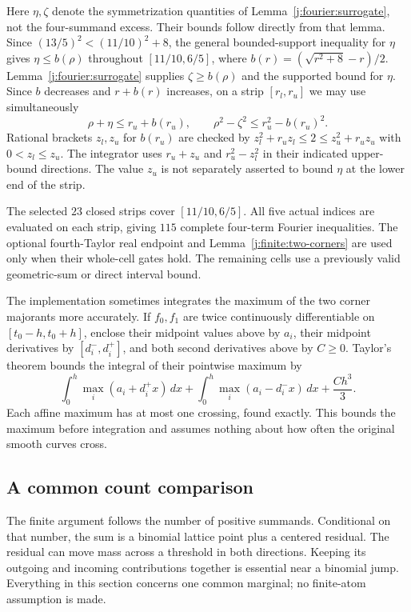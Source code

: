 Here $\eta,\zeta$ denote the symmetrization quantities of
Lemma~\ref{j:fourier:surrogate}, not the four-summand excess. Their
bounds follow directly from that lemma. Since
$(13/5)^2< (11/10)^2+8$, the general bounded-support inequality
for $\eta$ gives $\eta\le b(\rho)$ throughout $[11/10,6/5]$,
where $b(r)=(\sqrt{r^2+8}-r)/2$.
Lemma~\ref{j:fourier:surrogate} supplies $\zeta\ge b(\rho)$ and the supported bound for $\eta$.
Since $b$ decreases and $r+b(r)$ increases, on a strip $[r_l,r_u]$
we may use simultaneously
\[
 \rho+\eta\le r_u+b(r_u),\qquad
 \rho^2-\zeta^2\le r_u^2-b(r_u)^2.
\]
Rational brackets $z_l,z_u$ for $b(r_u)$ are checked by
$z_l^2+r_uz_l\le2\le z_u^2+r_uz_u$ with $0<z_l\le z_u$.
The integrator uses $r_u+z_u$ and $r_u^2-z_l^2$ in their indicated
upper-bound directions. The value $z_u$ is not separately asserted
to bound $\eta$ at the lower end of the strip.

The selected $23$ closed strips cover $[11/10,6/5]$. All five
actual indices are evaluated on each strip, giving $115$ complete
four-term Fourier inequalities. The optional fourth-Taylor real
endpoint and Lemma~\ref{j:finite:two-corners} are used only when their
whole-cell gates hold. The remaining cells use a previously valid
geometric-sum or direct interval bound.

The implementation sometimes integrates the maximum of the two
corner majorants more accurately. If $f_0,f_1$ are twice continuously
differentiable on $[t_0-h,t_0+h]$, enclose their midpoint values above
by $a_i$, their midpoint derivatives by $[d_i^-,d_i^+]$, and both
second derivatives above by $C\ge0$. Taylor's theorem bounds the
integral of their pointwise maximum by
\[
 \int_0^h\max_i(a_i+d_i^+x)\,dx
 +\int_0^h\max_i(a_i-d_i^-x)\,dx+\frac{Ch^3}{3}.
\]
Each affine maximum has at most one crossing, found exactly. This
bounds the maximum before integration and assumes nothing about
how often the original smooth curves cross.

\subsection{A common count comparison}\label{j:finite:finite-counts}
The finite argument follows the number of positive summands. Conditional on
that number, the sum is a binomial lattice point plus a centered residual.
The residual can move mass across a threshold in both directions. Keeping
its outgoing and incoming contributions together is essential near a
binomial jump. Everything in this section concerns one common marginal;
no finite-atom assumption is made.

